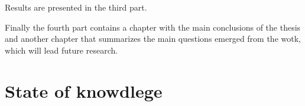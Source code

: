Results are presented in the third part.

Finally the fourth part contains a chapter with the main conclusions of the thesis and another chapter that summarizes the main questions emerged from the wotk, which will lead future research.


 
\chapter{State of knowdlege\label{cha:state}}


